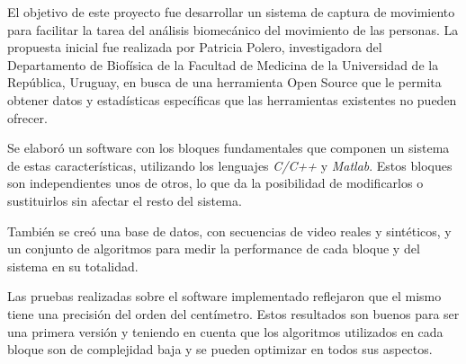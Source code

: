 El objetivo de este proyecto fue desarrollar un sistema de captura de movimiento para facilitar la tarea del análisis biomecánico del movimiento de las personas. La propuesta inicial fue realizada por Patricia Polero, investigadora del Departamento de Biofísica de la Facultad de Medicina de la Universidad de la República, Uruguay, en busca de una herramienta Open Source que le permita obtener datos y estadísticas específicas que las herramientas existentes no pueden ofrecer.

\vspace{3 mm}

Se elaboró un software con los bloques fundamentales que componen un sistema de estas características, utilizando los lenguajes \emph{C/C++} y \emph{Matlab}. Estos bloques son independientes unos de otros, lo que da la posibilidad de modificarlos o sustituirlos sin afectar el resto del sistema.

\vspace{3 mm}

También se creó una base de datos, con secuencias de video reales y sintéticos, y un conjunto de algoritmos para medir la performance de cada bloque y del sistema en su totalidad.

\vspace{3 mm}

Las pruebas realizadas sobre el software implementado reflejaron que el mismo tiene una precisión del orden del centímetro. Estos resultados son buenos para ser una primera versión y teniendo en cuenta que los algoritmos utilizados en cada bloque son de complejidad baja y se pueden optimizar en todos sus aspectos.
